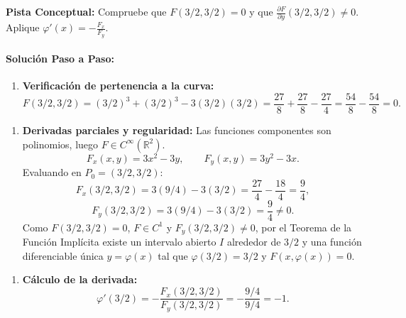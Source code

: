 \documentclass[11pt,a4paper]{article}
\begin{document}
\begin{tcolorbox}[colback=yellow!4,colframe=accentamber!70,arc=1mm,boxrule=0.5pt,left=3mm,right=3mm,top=1.5mm,bottom=1.5mm]
\textbf{Pista Conceptual:} Compruebe que $F(3/2, 3/2) = 0$ y que $\frac{\partial F}{\partial y}(3/2, 3/2) \neq 0$. Aplique $\varphi'(x) = -\frac{F_x}{F_y}$.
\end{tcolorbox}

\paragraph{Solución Paso a Paso:}\par
\begin{enumerate}[label=\textbf{\arabic*.}]
\item \textbf{Verificación de pertenencia a la curva:}
\begin{equation*}
F(3/2, 3/2) = (3/2)^3 + (3/2)^3 - 3(3/2)(3/2) = \frac{27}{8} + \frac{27}{8} - \frac{27}{4} = \frac{54}{8} - \frac{54}{8} = 0.
\end{equation*}
\end{enumerate}

\begin{enumerate}[label=\textbf{\arabic*.}]
\item \textbf{Derivadas parciales y regularidad:}
Las funciones componentes son polinomios, luego $F \in C^\infty(\mathbb{R}^2)$.
\begin{equation*}
F_x(x,y) = 3x^2 - 3y, \qquad F_y(x,y) = 3y^2 - 3x.
\end{equation*}
Evaluando en $P_0 = (3/2, 3/2)$:
\begin{equation*}
F_x(3/2, 3/2) = 3(9/4) - 3(3/2) = \frac{27}{4} - \frac{18}{4} = \frac{9}{4},
\end{equation*}
\begin{equation*}
F_y(3/2, 3/2) = 3(9/4) - 3(3/2) = \frac{9}{4} \neq 0.
\end{equation*}
Como $F(3/2, 3/2) = 0$, $F \in C^1$ y $F_y(3/2, 3/2) \neq 0$, por el Teorema de la Función Implícita existe un intervalo abierto $I$ alrededor de $3/2$ y una función diferenciable única $y = \varphi(x)$ tal que $\varphi(3/2) = 3/2$ y $F(x, \varphi(x)) = 0$.
\end{enumerate}

\begin{enumerate}[label=\textbf{\arabic*.}]
\item \textbf{Cálculo de la derivada:}
\begin{equation*}
\varphi'(3/2) = -\frac{F_x(3/2, 3/2)}{F_y(3/2, 3/2)} = -\frac{9/4}{9/4} = -1.
\end{equation*}
\end{enumerate}
\end{document}

